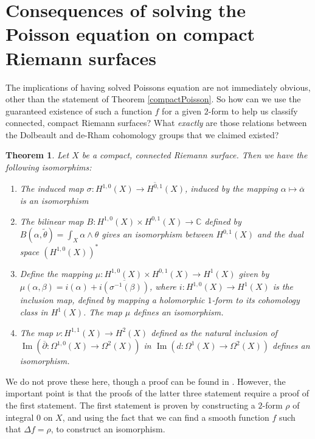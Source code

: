 \documentclass[11pt]{report}
\newtheorem{thm}{Theorem}[section]
\theoremstyle{definition}
\newenvironment{sproof}{%
  \renewcommand{\proofname}{Sketch Proof}\proof}{\endproof}
\DeclareMathOperator{\im}{Im}
\begin{document}
\section{Consequences of solving the Poisson equation on compact Riemann surfaces}
The implications of having solved Poissons equation are not immediately obvious, other than the statement of Theorem \ref{compactPoisson}. So how can we use the guaranteed existence of such a function $f$ for a given $2$-form to help us classify connected, compact Riemann surfaces? What \emph{exactly} are those relations between the Dolbeault and de-Rham cohomology groups that we claimed existed? 

\begin{thm}
  Let $X$ be a compact, connected Riemann surface. Then we have the following isomorphims:
  \begin{enumerate}
    \item The induced map $\sigma: H^{1,0}(X) \rightarrow \overline{H^{0,1}}(X)$, induced by the mapping $\alpha \mapsto \overline{\alpha}$ is an isomorphism
    \item The bilinear map $B:H^{1,0}(X)\times H^{0,1}(X) \rightarrow \mathbb{C}$ defined by $B(\alpha, \tilde{\theta})=\int_X \alpha \wedge \theta$ gives an isomorphism between $H^{0,1}(X)$ and the dual space $(H^{1,0}(X))^*$
    \item Define the mapping $\mu:H^{1,0}(X) \times H^{0,1}(X) \rightarrow H^1(X)$ given by $\mu(\alpha, \beta) = i(\alpha) + \overline{i(\sigma^{-1}(\beta))}$, where $i:H^{1,0}(X) \rightarrow H^1(X)$ is the inclusion map, defined by mapping a holomorphic $1$-form to its cohomology class in $H^1(X)$. The map $\mu$ defines an isomorphism.
    \item The map $\nu:H^{1,1}(X) \rightarrow H^2(X)$ defined as the natural inclusion of $\im(\overline{\partial}:\Omega^{1,0}(X)\rightarrow \Omega^2(X))$ in $\im(d:\Omega^1(X)\rightarrow \Omega^2(X))$ defines an isomorphism.
  \end{enumerate}
\end{thm}
\begin{sproof}
  We do not prove these here, though a proof can be found in \cite{notes}. However, the important point is that the proofs of the latter three statement require a proof of the first statement. The first statement is proven by constructing a $2$-form $\rho$ of integral $0$ on $X$, and using the fact that we can find a smooth function $f$ such that $\Delta f = \rho$, to construct an isomorphism.
\end{sproof}
\end{document}
